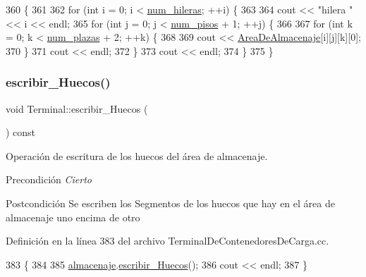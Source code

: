 \begin{DoxyCode}
360                                                   \{
361     
362     \textcolor{keywordflow}{for} (\textcolor{keywordtype}{int} i = 0; i < \hyperlink{class_terminal_a865c963b18aa837549dd637d439e8502}{num\_hileras}; ++i) \{
363         
364         cout << \textcolor{stringliteral}{"hilera "} << i << endl;
365         \textcolor{keywordflow}{for} (\textcolor{keywordtype}{int} j = 0; j < \hyperlink{class_terminal_ad6cdee7fe26b4443d45b0a18c345a86d}{num\_pisos} + 1; ++j) \{
366             
367             \textcolor{keywordflow}{for} (\textcolor{keywordtype}{int} k = 0; k < \hyperlink{class_terminal_a14265a71722ee28f3a50cee4a72e5607}{num\_plazas} + 2; ++k) \{
368                 
369                 cout << \hyperlink{class_terminal_a50670862a5cdeb0504efd1c45b6416dc}{AreaDeAlmacenaje}[i][j][k][0];
370             \}
371             cout << endl;
372         \}
373         cout << endl;
374     \}
375 \}
\end{DoxyCode}
\mbox{\label{class_terminal_afbfd7c045961e20718f9b5ffa1a31aa1}} 
\subsubsection{\texorpdfstring{escribir\+\_\+\+Huecos()}{escribir\_Huecos()}}
{\footnotesize\ttfamily void Terminal\+::escribir\+\_\+\+Huecos (\begin{DoxyParamCaption}{ }\end{DoxyParamCaption}) const}



Operación de escritura de los huecos del área de almacenaje. 

\begin{DoxyPrecond}{Precondición}
{\itshape Cierto} 
\end{DoxyPrecond}
\begin{DoxyPostcond}{Postcondición}
Se escriben los Segmentos de los huecos que hay en el área de almacenaje uno encima de otro 
\end{DoxyPostcond}


Definición en la línea 383 del archivo Terminal\+De\+Contenedores\+De\+Carga.\+cc.


\begin{DoxyCode}
383                                      \{
384     
385     \hyperlink{class_terminal_a1d87d7b16c4f460eee6f1ab73da90fd2}{almacenaje}.\hyperlink{class_almacenaje_a29e009f94265ea34b860f0918d3e1992}{escribir\_Huecos}();
386     cout << endl;
387 \}
\end{DoxyCode}


